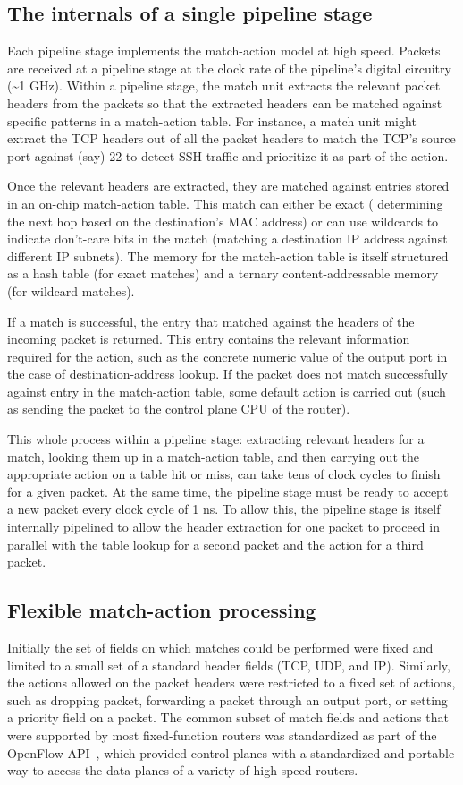 \subsection{The internals of a single pipeline stage} Each pipeline stage implements
the match-action model at high speed. Packets are received at a pipeline stage
at the clock rate of the pipeline's digital circuitry (\textasciitilde1 GHz).
Within a pipeline stage, the match unit extracts the relevant packet headers
from the packets so that the extracted headers can be matched against specific
patterns in a match-action table. For instance, a match unit might extract the
TCP headers out of all the packet headers to match the TCP's source port
against (say) 22 to detect SSH traffic and prioritize it as part of the action.

Once the relevant headers are extracted, they are matched against entries
stored in an on-chip match-action table. This match can either be exact (\eg
determining the next hop based on the destination's MAC address) or can use
wildcards to indicate don't-care bits in the match (\eg matching a destination
IP address against different IP subnets). The memory for the match-action table
is itself structured as a hash table (for exact matches) and a ternary
content-addressable memory (for wildcard matches).

If a match is successful, the entry that matched against the headers of the
incoming packet is returned. This entry contains the relevant information
required for the action, such as the concrete numeric value of the output port
in the case of destination-address lookup. If the packet does not match
successfully against entry in the match-action table, some default action is
carried out (such as sending the packet to the control plane CPU of the
router).

This whole process within a pipeline stage: extracting relevant headers for a
match, looking them up in a match-action table, and then carrying out the
appropriate action on a table hit or miss, can take tens of clock cycles to
finish for a given packet. At the same time, the pipeline stage must be ready
to accept a new packet every clock cycle of 1 ns. To allow this, the pipeline
stage is itself internally pipelined to allow the header extraction for one
packet to proceed in parallel with the table lookup for a second packet and the
action for a third packet.

\subsection{Flexible match-action processing}
Initially the set of fields on which matches could be performed were fixed and
limited to a small set of a standard header fields (\eg TCP, UDP, and IP).
Similarly, the actions allowed on the packet headers were restricted to a fixed
set of actions, such as dropping packet, forwarding a packet through an output
port, or setting a priority field on a packet. The common subset of match
fields and actions that were supported by most fixed-function routers was
standardized as part of the OpenFlow API~\cite{openflow}, which provided
control planes with a standardized and portable way to access the data planes
of a variety of high-speed routers.

